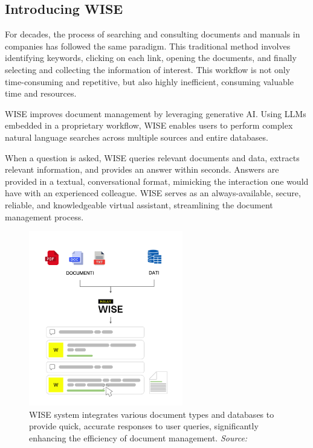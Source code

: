 \subsection{Introducing WISE}

For decades, the process of searching and consulting documents and manuals in companies has followed the same paradigm. This traditional method involves identifying keywords, clicking on each link, opening the documents, and finally selecting and collecting the information of interest. This workflow is not only time-consuming and repetitive, but also highly inefficient, consuming valuable time and resources.

WISE improves document management by leveraging generative AI. Using LLMs embedded in a proprietary workflow, WISE enables users to perform complex natural language searches across multiple sources and entire databases.

When a question is asked, WISE queries relevant documents and data, extracts relevant information, and provides an answer within seconds. Answers are provided in a textual, conversational format, mimicking the interaction one would have with an experienced colleague. WISE serves as an always-available, secure, reliable, and knowledgeable virtual assistant, streamlining the document management process. \cite{hpa2024}

\begin{figure}[h!]
    \centering
    \includegraphics[width=0.6\textwidth]{images/wise/wise-schema-verticale.png}
    \caption{WISE system integrates various document types and databases to provide quick, accurate responses to user queries, significantly enhancing the efficiency of document management. \textit{Source:} \cite{hpa2024}}
    \label{fig:wise-schema}
\end{figure}

